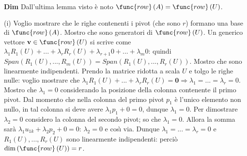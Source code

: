 \documentclass{article}
\begin{document}
\textbf{Dim} Dall'ultima lemma visto \`{e} noto $\func{row}\left( A\right) =%
\func{row}\left( U\right) $.

(i) Voglio mostrare che le righe contenenti i pivot (che sono $r$) formano
una base di $\func{row}\left( A\right) $. Mostro che sono generatori di $%
\func{row}\left( U\right) $. Un generico vettore $\mathbf{v}\in \func{row}%
\left( U\right) $ si scrive come $\lambda _{1}R_{1}\left( U\right)
+...+\lambda _{r}R_{r}\left( U\right) +\lambda _{r+1}0+...+\lambda _{m}0$:
quindi $Span\left( R_{1}\left( U\right) ,...,R_{m}\left( U\right) \right)
=Span\left( R_{1}\left( U\right) ,...,R_{r}\left( U\right) \right) $. Mostro
che sono linearmente indipendenti. Prendo la matrice ridotta a scala $U$ e
tolgo le righe nulle: voglio mostrare che $\lambda _{1}R_{1}\left( U\right)
+...+\lambda _{r}R_{r}\left( U\right) =\mathbf{0}\Longrightarrow \lambda
_{1}=...=\lambda _{r}=0$. Mostro che $\lambda _{1}=0$ considerando la
posizione della colonna contenente il primo pivot. Dal momento che nella
colonna del primo pivot $p_{1}$ \`{e} l'unico elemento non nullo, in tal
colonna si deve avere $\lambda _{1}p_{1}+0=0$, dunque $\lambda _{1}=0$. Per
dimostrare $\lambda _{2}=0$ considero la colonna del secondo pivot; so che $%
\lambda _{1}=0$. Allora la somma sar\`{a} $\lambda _{1}u_{1k}+\lambda
_{2}p_{2}+0=0$: $\lambda _{2}=0$ e cos\`{\i} via. Dunque $\lambda
_{1}=...=\lambda _{r}=0$ e $R_{1}\left( U\right) ,...,R_{r}\left( U\right) $
sono linearmente indipendenti: perci\`{o} $\dim \left( \func{row}\left(
U\right) \right) =r$.
\end{document}
